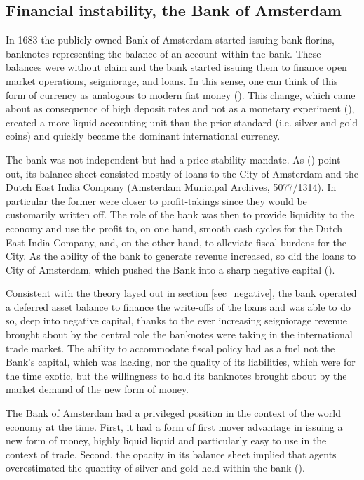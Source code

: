 \documentclass[american]{scrartcl}
\newcommand{\citein}[1]{\citeauthor{#1} (\citeyear{#1})}
\begin{document}
\subsection{Financial instability, the Bank of Amsterdam}

In 1683 the publicly owned Bank of Amsterdam started issuing bank florins, banknotes representing the balance of an account within the bank. These balances were without claim and the bank started issuing them to finance open market operations, seigniorage, and loans. In this sense, one can think of this form of currency as analogous to modern fiat money (\cite[p. 3]{Quinn2014}). This change, which came about as consequence of high deposit rates and not as a monetary experiment (\cite[p. 3]{Quinn2014}), created a more liquid accounting unit than the prior standard (i.e. silver and gold coins) and quickly became the dominant international currency.

The bank was not independent but had a price stability mandate. As \citein{Quinn2014} point out, its balance sheet consisted mostly of loans to the City of Amsterdam and the Dutch East India Company (Amsterdam Municipal Archives, 5077/1314). In particular the former were closer to profit-takings since they would be customarily written off. The role of the bank was then to provide liquidity to the economy and use the profit to, on one hand, smooth cash cycles for the Dutch East India Company, and, on the other hand, to alleviate fiscal burdens for the City. As the ability of the bank to generate revenue increased, so did the loans to City of Amsterdam, which pushed the Bank into a sharp negative capital (\cite[p. 5]{Quinn2014}).

Consistent with the theory layed out in section \ref{sec_negative}, the bank operated a deferred asset balance to finance the write-offs of the loans and was able to do so, deep into negative capital, thanks to the ever increasing seigniorage revenue brought about by the central role the banknotes were taking in the international trade market. The ability to accommodate fiscal policy had as a fuel not the Bank's capital, which was lacking, nor the quality of its liabilities, which were for the time exotic, but the willingness to hold its banknotes brought about by the market demand of the new form of money.

The Bank of Amsterdam had a privileged position in the context of the world economy at the time. First, it had a form of first mover advantage in issuing a new form of money, highly liquid liquid and particularly easy to use in the context of trade. Second, the opacity in its balance sheet implied that agents overestimated the quantity of silver and gold held within the bank (\cite[p. 11]{Quinn2014}).
\end{document}
